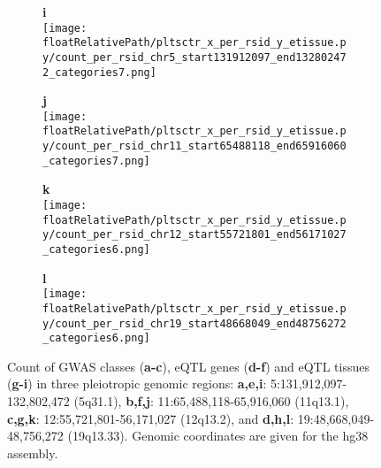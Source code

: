 \begin{figure}[!tbp]
\begin{subfigure}[]{.24\textwidth}
\textbf{i}
\\
\texttt{[image: \\floatRelativePath/pltsctr\_x\_per\_rsid\_y\_etissue.py/count\_per\_rsid\_chr5\_start131912097\_end132802472\_categories7.png]}
\end{subfigure}
%
\begin{subfigure}[]{.24\textwidth}
\textbf{j}
\\
\texttt{[image: \\floatRelativePath/pltsctr\_x\_per\_rsid\_y\_etissue.py/count\_per\_rsid\_chr11\_start65488118\_end65916060\_categories7.png]}
\end{subfigure}
%
\begin{subfigure}[]{.24\textwidth}
\textbf{k}
\\
\texttt{[image: \\floatRelativePath/pltsctr\_x\_per\_rsid\_y\_etissue.py/count\_per\_rsid\_chr12\_start55721801\_end56171027\_categories6.png]}
\end{subfigure}
%
\begin{subfigure}[]{.24\textwidth}
\textbf{l}
\\
\texttt{[image: \\floatRelativePath/pltsctr\_x\_per\_rsid\_y\_etissue.py/count\_per\_rsid\_chr19\_start48668049\_end48756272\_categories6.png]}
\end{subfigure}

\caption{Count of GWAS classes (\textbf{a-c}), eQTL genes (\textbf{d-f}) and eQTL tissues (\textbf{g-i}) in three
pleiotropic genomic regions: \textbf{a,e,i}: 5:131,912,097-132,802,472 (5q31.1), \textbf{b,f,j}: 11:65,488,118-65,916,060 (11q13.1),
    \textbf{c,g,k}: 12:55,721,801-56,171,027 (12q13.2), and \textbf{d,h,l}: 19:48,668,049-48,756,272 (19q13.33).
    Genomic coordinates are given for the hg38 assembly.}
\label{fig:region_gwas_egenes_tissues}
%
\end{figure}
